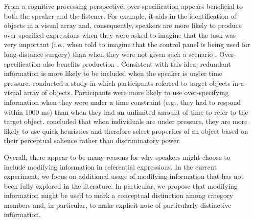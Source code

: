 \documentclass[output=paper]{langsci/langscibook}
\begin{document}
From a cognitive processing perspective, over-specification appears
beneficial to both the speaker and the listener. For example, it aids
in the identification of objects in a visual array and, consequently,
speakers are more likely to produce over-specified expressions when
they were asked to imagine that the task was very important (i.e.,
when told to imagine that the control panel is being used for
long-distance surgery) than when they were not given such a scenario \citep{arts2011}. Over-specification also benefits production \citep{pechmann1989incremental}. Consistent with this idea, redundant information is
more likely to be included when the speaker is under time
pressure. \citet{koolen2016distractor} conducted a study in
which participants referred to target objects in a visual array of
objects. Participants were more likely to use over-specifying
information when they were under a time constraint (e.g., they had to
respond within 1000 ms) than when they had an unlimited amount of time
to refer to the target object. \citet{koolen2016distractor} concluded that
when individuals are under pressure, they are more likely to use quick
heuristics and therefore select properties of an object based on their
perceptual salience rather than discriminatory power.

Overall, there appear to be many reasons for why speakers might choose
to include modifying information in referential expressions. In the
current experiment, we focus on additional usage of modifying
information that has not been fully explored in the literature. In
particular, we propose that modifying information might be used to
mark a conceptual distinction among category members and, in
particular, to make explicit note of particularly distinctive
information.
\end{document}
